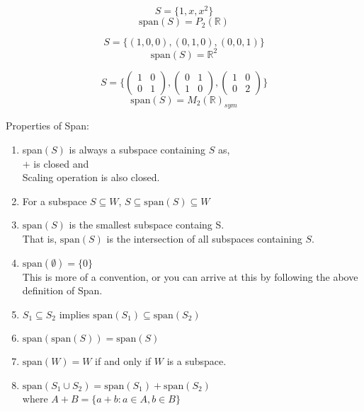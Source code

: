 \documentclass[11pt,a4paper]{colorart}
\def\l{\left}
\def\r{\right}
\def\es{\emptyset}
\def\R{\mathbb{R}}
\begin{document}
\begin{example}
	\[ S = \{1,x,x^2\} \]
	\[ \text{span}\l(S\r) = P_2\l(\R\r) \]
\end{example}

\begin{example}
	\[ S = \{\l(1,0,0\r),\l(0,1,0\r),\l(0,0,1\r)\} \]
	\[ \text{span}\l(S\r) = \R^2 \]
\end{example}

\begin{example}
	\[ S = \{ \begin{pmatrix} 1 & 0 \\ 0 & 1 \end{pmatrix},
		  \begin{pmatrix} 0 & 1 \\ 1 & 0 \end{pmatrix},
		  \begin{pmatrix} 1 & 0 \\ 0 & 2 \end{pmatrix}	\} \]
	\[ \text{span}\l(S\r) = M_2\l(\R\r)_{sym} \]
\end{example}

Properties of Span:

\begin{enumerate}
	\item span$\l(S\r)$ is always a subspace containing $S$ as,\\
		$+$ is closed and\\
		Scaling operation is also closed.
	\item For a subspace $S\subseteq W$, $S\subseteq \text{span}\l(S\r) \subseteq W$
	\item $\text{span}\l(S\r)$ is the smallest subspace containg S.\\
	      That is, $\text{span}\l(S\r)$ is the intersection of all subspaces containing $S$.
        \item $\text{span}\l(\es\r) = \{ 0\}$\\
	      This is more of a convention, or you can arrive at this by following the above definition of Span.
      \item $S_1 \subseteq S_2$ implies $\text{span}\l(S_1\r) \subseteq \text{span}\l(S_2\r)$
      \item $\text{span}\l(\text{span}\l(S\r)\r) = \text{span}\l(S\r) $ 
      \item $\text{span}\l(W\r) = W$ if and only if $W$ is a subspace.
      \item $\text{span}\l(S_1\cup S_2\r) = \text{span}\l(S_1\r) +\text{span}\l(S_2\r)$\\
	      where $A+B=\{a+b:a\in A,b\in B\}$
\end{enumerate}
\end{document}
